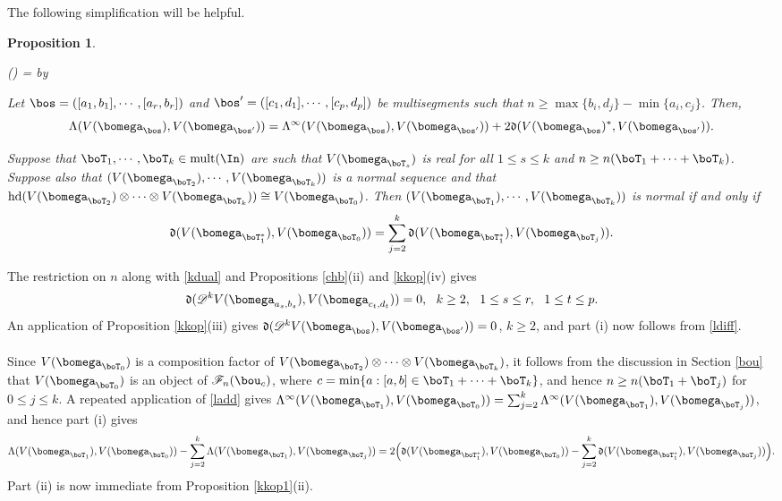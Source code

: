 \documentclass[11pt,reqno]{amsart}
\newtheorem*{prop}{Proposition}
\theoremstyle{definition} \newtheorem*{defn}{Definition}
\theoremstyle{definition}
\newenvironment{pf}{\proof}{\endproof}
\newcounter{cnt}
\newenvironment{enumerit}{\begin{list}{{\hfill\rm(\roman{cnt})\hfill}}{%
\settowidth{\labelwidth}{{\rm(iv)}}\leftmargin=\labelwidth%
\advance\leftmargin by \labelsep\rightmargin=0pt\usecounter{cnt}}}{\end{list}} \makeatletter
\numberwithin{equation}{section}
\newcommand{\lie}[1]{\mathfrak{#1}}
\def\mult{\operatorname{mult}}
\begin{document}
\subsubsection{}  The following simplification will be helpful.\begin{prop}\label{Linfty}

\begin{enumerit}
\item[(i)] Let $\bos=([a_1,b_1],\cdots,[a_r,b_r])$ and $\bos'=([c_1,d_1],\cdots,[c_p,d_p])$ be multisegments such that
$n\geq \max\{b_i,d_j\}-\min\{a_i,c_j\}$. Then,
$$\Lambda(V(\bomega_{\bos}),V(\bomega_{\bos'})) = \Lambda^{\infty}(V(\bomega_{\bos}),V(\bomega_{\bos'})) +
2\lie d(V(\bomega_{\bos})^*,V(\bomega_{\bos'})).$$
\item[(ii)] Suppose that $\boT_1,\cdots, \boT_k\in\mult(\In)$ are such that $V(\bomega_{\boT_s})$ is real
for all $1\le s\le k$ and $n\ge n(\boT_1+\cdots+\boT_k)$. Suppose also that
$(V(\bomega_{\boT_2}),\cdots, V(\bomega_{\boT_k}))$ is a normal sequence and that
${\rm hd}(V(\bomega_{\boT_2})\otimes\cdots\otimes V(\bomega_{\boT_k}))\cong V(\bomega_{\boT_0})$. Then
$(V(\bomega_{\boT_1}),\cdots, V(\bomega_{\boT_k}))$ is normal if and only if
$$\lie d(V(\bomega_{\boT_1^*}), V(\bomega_{\boT_0}))=\sum_{j=2}^k\lie d(V(\bomega_{\boT_1^*}), V(\bomega_{\boT_j})).$$
\end{enumerit}
\end{prop}
\begin{pf}
The restriction on $n$ along with \eqref{kdual} and Propositions \ref{chb}(ii) and \ref{kkop}(iv) gives
$$\lie d(\mathscr D^kV(\bomega_{a_s,b_s}), V(\bomega_{c_t,d_t}))=0,\ \ k\ge 2,\ \ 1\le s\le r,\ \ 1\le t\le p.$$
An application of Proposition \ref{kkop}(iii) gives $\lie d(\mathscr D^k V(\bomega_\bos), V(\bomega_{\bos'}))=0$,
$k\geq 2$, and part (i) now follows from \eqref{ldiff}.
\\\\
Since $V(\bomega_{\boT_0})$ is a composition factor of $V(\bomega_{\boT_2})\otimes\cdots\otimes
V(\bomega_{\boT_k})$, it follows from the discussion in Section \ref{bou} that $V(\bomega_{\boT_0})$ is an object of
$\mathscr F_n(\bou_c)$, where $c=\min\{a:[a,b]\in\boT_1+\cdots+\boT_k\}$, and hence
$n\ge n(\boT_1+\boT_j)$ for $0\le j\le k$. A repeated application of
\eqref{ladd} gives
$\Lambda^\infty(V(\bomega_{\boT_1}),V(\bomega_{\boT_0}))=\sum_{j=2}^k\Lambda^\infty(V(\bomega_{\boT_1}),V(\bomega_{\boT_j}))$,
and hence part (i) gives
$$\Lambda(V(\bomega_{\boT_1}),V(\bomega_{\boT_0}))-\sum_{j=2}^k\Lambda(V(\bomega_{\boT_1}),V(\bomega_{\boT_j}))
=2\Big(\lie d(V(\bomega_{\boT_1^*}),V(\bomega_{\boT_0}))-\sum_{j=2}^k\lie d(V(\bomega_{\boT_1^*}),
V(\bomega_{\boT_j}))\Big).$$
Part (ii) is now immediate from Proposition \ref{kkop1}(ii).
\end{pf}
\end{document}
